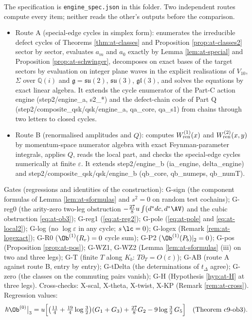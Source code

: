 The specification is \texttt{engine\_spec.json} in this folder. Two independent routes compute every item; neither reads the other's outputs before the comparison.
\begin{itemize}
\item Route A (special-edge cycles in simplex form): enumerates the irreducible defect cycles of Theorems \ref{thm:at-classes} and Proposition \ref{prop:at-classes2} sector by sector, evaluates $a_m$ and $a_0$ exactly by Lemma \ref{lem:at-special} and Proposition \ref{prop:at-schwinger}, decomposes on exact bases of the target sectors by evaluation on integer plane waves in the explicit realisations of $V_{10}$, $\Sigma$ over $\mathbb Q(i)$ and $\mathfrak g=\mathfrak{su}(2)$, $\mathfrak{su}(3)$, $\mathfrak{gl}(3)$, and solves the equations by exact linear algebra. It extends the cycle enumerator of the Part-C action engine (step2/engine\_a, s2\_*) and the defect-chain code of Part Q (step2/composite\_qsk/qsk/engine\_a, qa\_core, qa\_s1) from chains through two letters to closed cycles.
\item Route B (renormalised amplitudes and $Q$): computes $W^{(1)}_{\rm ren}(x)$ and $W^{(2)}_{\rm ren}(x,y)$ by momentum-space numerator algebra with exact Feynman-parameter integrals, applies $Q$, reads the local part, and checks the special-edge cycles numerically at finite $\varepsilon$. It extends step2/engine\_b (ia\_engine, delta\_engine) and step2/composite\_qsk/qsk/engine\_b (qb\_core, qb\_numeps, qb\_numT).
\end{itemize}
Gates (regressions and identities of the construction): G-sign (the component formulas of Lemma \ref{lem:at-sformulas} and $s^2=0$ on random test cochains); G-reg0 (the arity-zero two-leg obstruction $-\tfrac{27}8u\int(d^*dc,d^*\AV)$ and the cubic obstruction \eqref{eq:at-ob3}); G-reg1 (\eqref{eq:at-reg2}); G-pole (\eqref{eq:at-pole} and \eqref{eq:at-local2}); G-log (no $\log\varepsilon$ in any cycle; $s\,\lc=0$); G-logex (Remark \ref{rem:at-logexact}); G-R0 ($\Ob^{(1)}(R_r)=0$ cycle sum); G-P2 ($\Ob^{(1)}(P_b)|_2=0$); G-pos (Proposition \ref{prop:at-pos}); G-WZ1, G-WZ2 (Lemma \ref{lem:at-sformulas} (iii) on two and three legs); G-T (finite $T$ along $K_b$: $T\partial_T=O(\varepsilon)$); G-AB (route A against route B, entry by entry); G-tDelta (the determinations of $t_\Delta$ agree); G-zero (the classes on the commuting pairs vanish); G-H (Hypothesis \ref{hyp:at-H} at three legs). Cross-checks: X-scal, X-theta, X-twist, X-KP (Remark \ref{rem:at-cross}). Regression values:
\begin{equation}
\hbar\Ob^{(0)}\big|_3=u\Big[\big(\tfrac{11}4+\tfrac{19}4\log\tfrac32\big)(G_1+G_3)+\tfrac{27}8G_2-9\log\tfrac32\,G_5\Big]\quad(\text{Theorem c9-ob3}).
\label{eq:at-ob3}
\end{equation}

